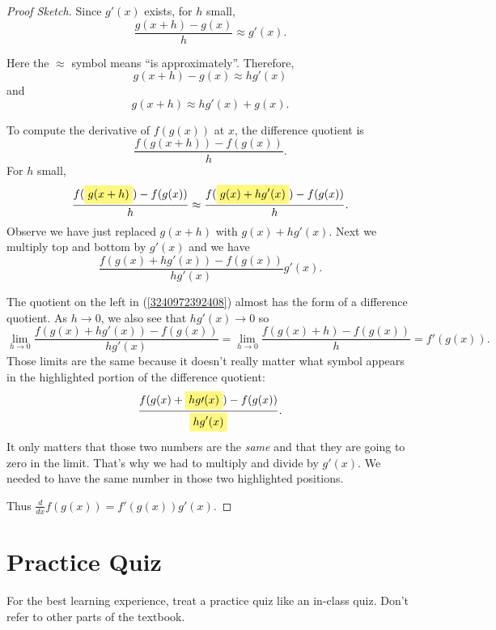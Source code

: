 \documentclass[11pt]{book}
\newcommand{\highlight}[1]{%
  \colorbox{yellow!50}{$\displaystyle#1$}}
\numberwithin{example}{chapter}
\begin{document}
\begin{proof}[Proof Sketch]

Since $g'(x)$ exists, for $h$ small, 
$$\frac{g(x+h)-g(x)}{h}\approx g'(x).$$

Here the $\approx$ symbol means ``is approximately''.  Therefore, 
$$g(x+h)-g(x)\approx hg'(x)$$
and 
$$g(x+h)\approx hg'(x)+g(x).$$

To compute the derivative of $f(g(x))$ at $x$, the difference quotient is $$\frac{f(g(x+h))-f(g(x))}{h}.$$
For $h$ small, 
$$ 
\frac{f(\highlight{g(x+h)})-f(g(x))}{h} \approx \frac{f(\highlight{g(x) + hg'(x)})-f(g(x))}{h}.$$
Observe we have just replaced $g(x+h)$ with $g(x) + hg'(x)$.  Next we multiply top and bottom by $g'(x)$ and we have 
\begin{equation} \label{3240972392408}
\frac{f(g(x) + hg'(x))-f(g(x))}{hg'(x)} g'(x).
\end{equation}

The quotient on the left in  (\ref{3240972392408}) almost has the form of a difference quotient.  As $h\to 0$, we also see that $hg'(x)\to 0$ so 
$$\lim_{h\to 0} \frac{f(g(x) + hg'(x))-f(g(x))}{hg'(x)}  = \lim_{h\to 0} \frac{f(g(x) + h)-f(g(x))}{h} = f'(g(x)).$$
Those limits are the same because it doesn't really matter what symbol appears in the highlighted portion of the difference quotient: 
$$\frac{f(g(x) + \highlight{hg\prime(x)})-f(g(x))}{\highlight{hg'(x)}}.$$
It only matters that those two numbers are the \emph{same} and that they are going to zero in the limit.  That's why we had to multiply and divide by $g'(x)$.  We needed to have the same number in those two highlighted positions.  

Thus $\frac{d}{dx}f(g(x)) = f'(g(x))g'(x)$.
\end{proof}

\section{Practice Quiz}

For the best learning experience, treat a practice quiz like an in-class quiz. Don't refer to other parts of the textbook.
\end{document}
